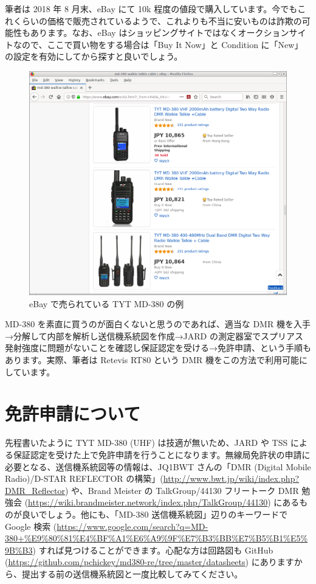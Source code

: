 \documentclass[a4j,oneside]{ujbook}
\begin{document}
筆者は 2018 年 8 月末、eBay にて \yen10k 程度の値段で購入しています。今でもこれくらいの価格で販売されているようで、これよりも不当に安いものは詐欺の可能性もあります。なお、eBay はショッピングサイトではなくオークションサイトなので、ここで買い物をする場合は「Buy It Now」と Condition に「New」の設定を有効にしてから探すと良いでしょう。
\begin{figure}[H]
 \centering
 \includegraphics[width=15cm]{img/md380-ebay.png}
 \caption{eBay で売られている TYT MD-380 の例}
\end{figure}
MD-380 を素直に買うのが面白くないと思うのであれば、適当な DMR 機を入手→分解して内部を解析し送信機系統図を作成→JARD の測定器室でスプリアス発射強度に問題がないことを確認し保証認定を受ける→免許申請、という手順もあります。実際、筆者は Retevis RT80 という DMR 機をこの方法で利用可能にしています。

\section{免許申請について}

先程書いたように TYT MD-380 (UHF) は技適が無いため、JARD や TSS による保証認定を受けた上で免許申請を行うことになります。無線局免許状の申請に必要となる、送信機系統図等の情報は、JQ1BWT さんの「DMR (Digital Mobile Radio)/D-STAR REFLECTOR の構築」(\url{http://www.bwt.jp/wiki/index.php?DMR_Reflector}) や、Brand Meister の TalkGroup/44130 フリートーク DMR 勉強会 (\url{https://wiki.brandmeister.network/index.php/TalkGroup/44130}) にあるものが良いでしょう。他にも、「MD-380 送信機系統図」辺りのキーワードで Google 検索 (\url{https://www.google.com/search?q=MD-380+%E9%80%81%E4%BF%A1%E6%A9%9F%E7%B3%BB%E7%B5%B1%E5%9B%B3}) すれば見つけることができます。心配な方は回路図も GitHub (\url{https://github.com/pchickey/md380-re/tree/master/datasheets}) にありますから、提出する前の送信機系統図と一度比較してみてください。
\end{document}

